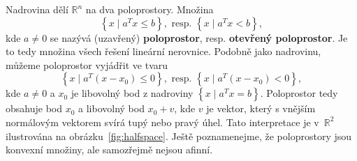Nadrovina dělí $\mathbb{R}^n$ na dva poloprostory. Množina 
$$
    \left\{ x \mid a^T x \leq b \right\}, \text{ resp. } \left\{ x \mid a^T x < b \right\},
$$
kde $a \neq 0$ se nazývá (uzavřený) \textbf{poloprostor}, resp. \textbf{otevřený poloprostor}. Je to tedy množina všech řešení lineární nerovnice. Podobně jako nadrovinu, můžeme poloprostor vyjádřit ve tvaru
$$
    \left\{ x \mid a^T (x - x_0) \leq 0 \right\}, \text{ resp. } \left\{ x \mid a^T (x - x_0) < 0 \right\},
$$
kde $a \neq 0$ a $x_0$ je libovolný bod z nadroviny $\left\{ x \mid a^T x = b \right\}$. Poloprostor tedy obsahuje bod $x_0$ a libovolný bod $x_0 + v$, kde $v$ je vektor, který s vnějším normálovým vektorem svírá tupý nebo pravý úhel. Tato interpretace je v~$\mathbb{R}^2$ ilustrována na obrázku~\ref{fig:halfspace}. Ještě poznamenejme, že poloprostory jsou konvexní množiny, ale samozřejmě nejsou afinní.

